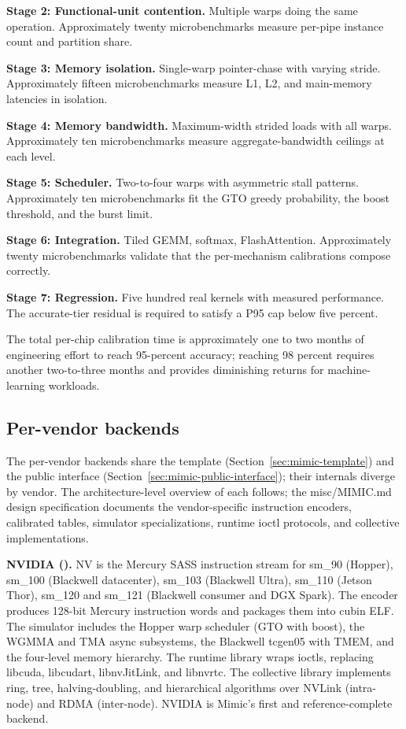 \textbf{Stage 2: Functional-unit contention.}
Multiple warps doing the same operation.
Approximately twenty microbenchmarks measure per-pipe instance count and partition share.

\textbf{Stage 3: Memory isolation.}
Single-warp pointer-chase with varying stride.
Approximately fifteen microbenchmarks measure L1, L2, and main-memory latencies in isolation.

\textbf{Stage 4: Memory bandwidth.}
Maximum-width strided loads with all warps.
Approximately ten microbenchmarks measure aggregate-bandwidth ceilings at each level.

\textbf{Stage 5: Scheduler.}
Two-to-four warps with asymmetric stall patterns.
Approximately ten microbenchmarks fit the GTO greedy probability, the boost threshold, and the burst limit.

\textbf{Stage 6: Integration.}
Tiled GEMM, softmax, FlashAttention.
Approximately twenty microbenchmarks validate that the per-mechanism calibrations compose correctly.

\textbf{Stage 7: Regression.}
Five hundred real kernels with measured performance.
The accurate-tier residual is required to satisfy a P95 cap below five percent.

The total per-chip calibration time is approximately one to two months of engineering effort to reach 95-percent accuracy; reaching 98 percent requires another two-to-three months and provides diminishing returns for machine-learning workloads.

\subsection{Per-vendor backends}
\label{sec:mimic-per-vendor}

The per-vendor backends share the template (Section~\ref{sec:mimic-template}) and the public interface (Section~\ref{sec:mimic-public-interface}); their internals diverge by vendor.
The architecture-level overview of each follows; the misc/MIMIC.md design specification documents the vendor-specific instruction encoders, calibrated tables, simulator specializations, runtime ioctl protocols, and collective implementations.

\textbf{NVIDIA ().}
NV is the Mercury SASS instruction stream for sm\_90 (Hopper), sm\_100 (Blackwell datacenter), sm\_103 (Blackwell Ultra), sm\_110 (Jetson Thor), sm\_120 and sm\_121 (Blackwell consumer and DGX Spark).
The encoder produces 128-bit Mercury instruction words and packages them into cubin ELF.
The simulator includes the Hopper warp scheduler (GTO with boost), the WGMMA and TMA async subsystems, the Blackwell tcgen05 with TMEM, and the four-level memory hierarchy.
The runtime library wraps  ioctls, replacing libcuda, libcudart, libnvJitLink, and libnvrtc.
The collective library implements ring, tree, halving-doubling, and hierarchical algorithms over NVLink (intra-node) and RDMA (inter-node).
NVIDIA is Mimic's first and reference-complete backend.

